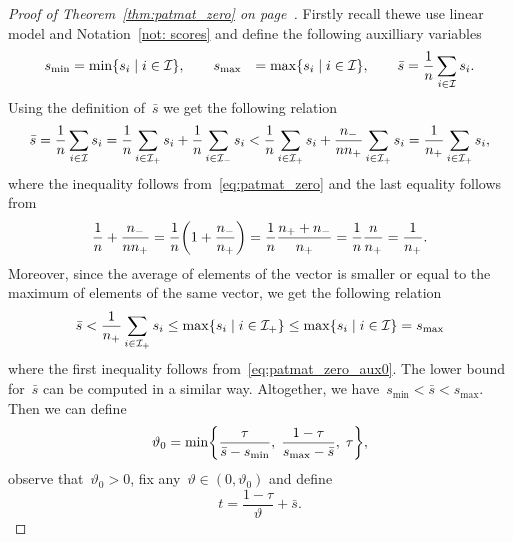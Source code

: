 \patmatzero*
\begin{proof}[Proof of Theorem~\ref{thm:patmat_zero} on page~\pageref{thm:patmat_zero}]
  Firstly recall thewe use linear model and Notation~\ref{not: scores} and define the following auxilliary variables
  \begin{equation*}
    \begin{aligned}
      s_{\min} & = \min \Set{s_i}{i \in \I}, \qquad
      s_{\max} & = \max \Set{s_i}{i \in \I}, \qquad
      \bar{s} & = \frac{1}{n} \sum_{i \in \I} s_i. \\
    \end{aligned}
  \end{equation*}
  Using the definition of~$\bar{s}$ we get the following relation
  \begin{equation}\label{eq:patmat_zero_aux0}
    \bar{s}
      = \frac{1}{n} \sum_{i \in \mathcal{I}} s_i
      = \frac{1}{n}\sum_{i \in \mathcal{I}_{+}} s_i + \frac{1}{n} \sum_{i \in \mathcal{I}_{-}} s_i
      < \frac{1}{n} \sum_{i \in \mathcal{I}_{+}} s_i + \frac{n_{-}}{nn_{+}} \sum_{i \in \mathcal{I}_{+}} s_i
      = \frac{1}{n_{+}} \sum_{i \in \mathcal{I}_{+}} s_i,
  \end{equation}
  where the inequality follows from~\eqref{eq:patmat_zero} and the last equality follows from
  \begin{equation*}
    \frac{1}{n} + \frac{\nneg}{n\npos}
      = \frac{1}{n} \Brac{1 + \frac{\nneg}{\npos}} 
      = \frac{1}{n} \frac{\npos + \nneg}{\npos}
      = \frac{1}{n} \frac{n}{\npos}
      = \frac{1}{\npos}.
  \end{equation*}
  Moreover, since the average of elements of the  vector is smaller or equal to the maximum of elements of the same vector, we get the following relation
  \begin{equation*}
    \bar{s}
      < \frac{1}{\npos} \sum_{i \in \Ipos} s_i
      \leq \max \Set{s_i}{i \in \Ipos}
      \leq \max \Set{s_i}{i \in \I}
      = s_{\max}
  \end{equation*}
  where the first inequality follows from~\eqref{eq:patmat_zero_aux0}. The lower bound for~$\bar{s}$ can be computed in a similar way. Altogether, we have~$s_{\min} < \bar{s} < s_{\max}$. Then we can define
  \begin{equation*}
    \vartheta_0 = \min\Brac[c]{\frac{\tau}{\bar{s} - s_{\min}}, \; \frac{1-\tau}{s_{\max}-\bar{s}}, \; \tau},
  \end{equation*}
  observe that~$\vartheta_0 > 0$, fix any~$\vartheta \in (0, \vartheta_0)$ and define
  \begin{equation*}
    t = \frac{1 - \tau}{\vartheta} + \bar{s}.

\end{equation*}
\end{proof}
